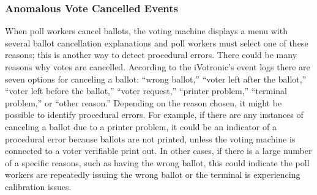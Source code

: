 \subsubsection{Anomalous Vote Cancelled Events}
When poll workers cancel ballots, the voting machine displays a menu with several ballot cancellation explanations and poll workers must select one of these reasons; this is another way to detect procedural errors. There could be many reasons why votes are cancelled. According to the iVotronic’s event logs there are seven options for canceling a ballot: \textquotedblleft wrong ballot,\textquotedblright \hspace{1 mm} \textquotedblleft voter left after the ballot,\textquotedblright \hspace{1 mm}  \textquotedblleft voter left before the ballot,\textquotedblright \hspace{1 mm}  \textquotedblleft voter request,\textquotedblright \hspace{1 mm}  \textquotedblleft printer problem,\textquotedblright \hspace{1 mm}  \textquotedblleft terminal problem,\textquotedblright \hspace{1 mm}  or \textquotedblleft other reason.\textquotedblright \hspace{2 mm}  Depending on the reason chosen, it might be possible to identify procedural errors.  For example, if there are any instances of canceling a ballot due to a printer problem, it could be an indicator of a procedural error because ballots are not printed, unless the voting machine is connected to a voter verifiable print out. In other cases, if there is a large number of a specific reasons, such as having the wrong ballot, this could indicate the poll workers are repeatedly issuing the wrong ballot or the terminal is experiencing calibration issues.  

